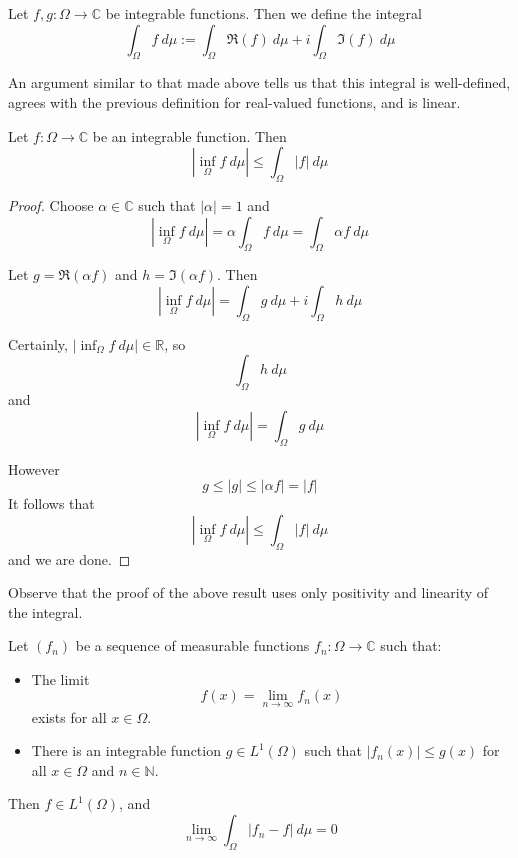 \begin{definition}
Let $f,g\colon \Omega \rightarrow {\mathbb C}$ be integrable functions.  Then we define the integral
$$\int_\Omega f\ d\mu := \int_\Omega \Re (f)\ d\mu +i \int_\Omega \Im (f)\ d\mu$$
\end{definition}

An argument similar to that made above tells us that this integral is well-defined, agrees with the previous definition for real-valued functions, and is linear.

\begin{proposition} \label{posineq}
Let $f\colon \Omega \rightarrow {\mathbb C}$ be an integrable function.  Then
$$\left| \inf_\Omega f\ d\mu \right| \leq \int_\Omega |f|\ d\mu$$
\end{proposition}

\begin{proof}
Choose $\alpha \in {\mathbb C}$ such that $|\alpha |=1$ and
$$\left| \inf_\Omega f\ d\mu \right| = \alpha \int_\Omega f\ d\mu = \int_\Omega \alpha f\ d\mu$$

Let $g = \Re (\alpha f )$ and $h= \Im (\alpha f)$.  Then
$$\left| \inf_\Omega f\ d\mu \right| = \int_\Omega g\ d\mu + i \int_\Omega h\ d\mu$$

Certainly, $\left| \inf_\Omega f\ d\mu \right| \in {\mathbb R}$, so
$$\int_\Omega h\ d\mu$$
and
$$\left| \inf_\Omega f\ d\mu \right| = \int_\Omega g\ d\mu$$

However
$$g\leq  |g| \leq |\alpha f| = |f|$$  
It follows that
$$\left| \inf_\Omega f\ d\mu \right| \leq \int_\Omega |f|\ d\mu$$
and we are done.
\end{proof}

Observe that the proof of the above result uses only positivity and linearity of the integral.

\begin{theorem}
Let $(f_n)$ be a sequence of measurable functions $f_n \colon \Omega \rightarrow {\mathbb C}$ such that:

\begin{itemize}

\item The limit
$$f(x) = \lim_{n\rightarrow \infty} f_n (x)$$
exists for all $x\in \Omega$.

\item There is an integrable function $g\in L^1 (\Omega )$ such that $|f_n (x)|\leq g(x)$ for all $x\in \Omega$ and $n\in {\mathbb N}$.

\end{itemize}

Then $f\in L^1 (\Omega )$, and
$$\lim_{n\rightarrow \infty} \int_\Omega |f_n - f|\ d\mu =0$$
\end{theorem}

